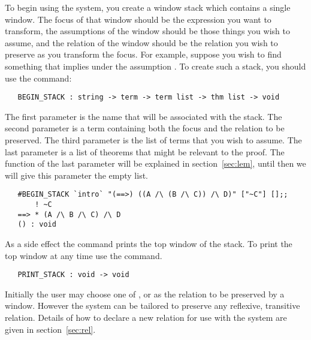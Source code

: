 To begin using the system,
you create a window stack which contains a single window.
The focus of that window should be the expression you want to transform,
the assumptions of the window should be those things you wish to assume,
and the relation of the window should be 
the relation you wish to preserve as you transform the focus.
For example, suppose you wish to find something that implies
 under the assumption .
To create such a stack, you should use the command:
\begin{boxed}\begin{verbatim}
   BEGIN_STACK : string -> term -> term list -> thm list -> void
\end{verbatim}\end{boxed}
The first parameter is the name that will be associated with the stack.
The second parameter is a term containing both the focus and the relation
to be preserved.
The third parameter is the list of terms that you wish to assume.
The last parameter is a list of theorems that might be relevant to the proof.
The function of the last parameter will be explained in section~\ref{sec:lem},
until then we will give this parameter the empty list.
\setcounter{sessioncount}{1}
\begin{session}\begin{verbatim}
   #BEGIN_STACK `intro` "(==>) ((A /\ (B /\ C)) /\ D)" ["~C"] [];;
       ! ~C
   ==> * (A /\ B /\ C) /\ D
   () : void
\end{verbatim}\end{session}
As a side effect the
command prints the top window of the stack.
To print the top window at any time use the
command.
\begin{boxed}\begin{verbatim}
   PRINT_STACK : void -> void
\end{verbatim}\end{boxed}

Initially the user may choose one of ,  or  as
the relation to be preserved by a window.
However the system can be tailored to preserve any reflexive, transitive
relation.
Details of how to declare a new relation for use with the system are
given in section~\ref{sec:rel}.

